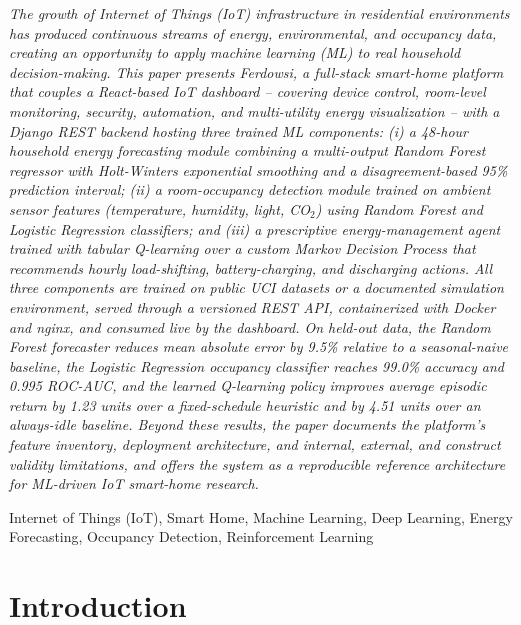 \documentclass[11pt,a4paper]{article}
\begin{document}
\begingroup
\fontsize{12}{15}\selectfont\itshape
\noindent The growth of Internet of Things (IoT) infrastructure in residential environments has produced continuous streams of energy, environmental, and occupancy data, creating an opportunity to apply machine learning (ML) to real household decision-making. This paper presents Ferdowsi, a full-stack smart-home platform that couples a React-based IoT dashboard -- covering device control, room-level monitoring, security, automation, and multi-utility energy visualization -- with a Django REST backend hosting three trained ML components: (i) a 48-hour household energy forecasting module combining a multi-output Random Forest regressor with Holt-Winters exponential smoothing and a disagreement-based 95\% prediction interval; (ii) a room-occupancy detection module trained on ambient sensor features (temperature, humidity, light, CO$_2$) using Random Forest and Logistic Regression classifiers; and (iii) a prescriptive energy-management agent trained with tabular Q-learning over a custom Markov Decision Process that recommends hourly load-shifting, battery-charging, and discharging actions. All three components are trained on public UCI datasets or a documented simulation environment, served through a versioned REST API, containerized with Docker and nginx, and consumed live by the dashboard. On held-out data, the Random Forest forecaster reduces mean absolute error by 9.5\% relative to a seasonal-naive baseline, the Logistic Regression occupancy classifier reaches 99.0\% accuracy and 0.995 ROC-AUC, and the learned Q-learning policy improves average episodic return by 1.23 units over a fixed-schedule heuristic and by 4.51 units over an always-idle baseline. Beyond these results, the paper documents the platform's feature inventory, deployment architecture, and internal, external, and construct validity limitations, and offers the system as a reproducible reference architecture for ML-driven IoT smart-home research.
\endgroup

\vspace{0.4em}
 \fontsize{12}{14}\selectfont Internet of Things (IoT), Smart Home, Machine Learning, Deep Learning, Energy Forecasting, Occupancy Detection, Reinforcement Learning

\section{Introduction}
\end{document}
